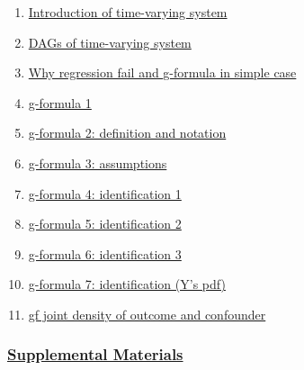\documentclass[11pt]{article}
\begin{document}
\begin{multicols}{2}
	\begin{enumerate}
		\item \href{https://mp.weixin.qq.com/s/RmfZv7W4_e6vWohTkAYGjg}{Introduction of time-varying system}	%
		\item \href{https://mp.weixin.qq.com/s/YJnn2hG_jsK-7BxGfgobTQ}{DAGs of time-varying system}	%
		\item \href{https://mp.weixin.qq.com/s/W7W-MO-VCpU92tYF73aqRQ}{\small Why regression fail and g-formula in simple case}	%
		\item \href{https://mp.weixin.qq.com/s/B3rAP8NRpz60hfU1PpgJ4A}{g-formula 1}	%
		\item \href{https://mp.weixin.qq.com/s/1UlKBo28nTVETec53cIn3Q}{g-formula 2: definition and notation}	%
		\item \href{https://mp.weixin.qq.com/s/nuRefZw7A7BsL10giGz__w}{g-formula 3: assumptions}	%
		\item \href{https://mp.weixin.qq.com/s/mJsF27jYbdXUu9gAlkhIFw}{g-formula 4: identification 1}	%
		\item \href{https://mp.weixin.qq.com/s/oe3ygsTkzY3s9sw3CgVDXw}{g-formula 5: identification 2}	%
		\item \href{https://mp.weixin.qq.com/s/GOce-aNrvnZz-zpeZJxTrg}{g-formula 6: identification 3}	%
		\item \href{https://mp.weixin.qq.com/s/ne_rbSLWPXV5hoGrySikrw}{g-formula 7: identification (Y's pdf)}	%
		\item \href{https://mp.weixin.qq.com/s/FUYsX3IZQLBjW-7yoI35Lw}{gf joint density of outcome and confounder}	%
	\end{enumerate}
\end{multicols}

\newpage 

\subsubsection*{\href{https://space.bilibili.com/491707363/lists/25679?type=season}{Supplemental Materials}}

\end{document}
